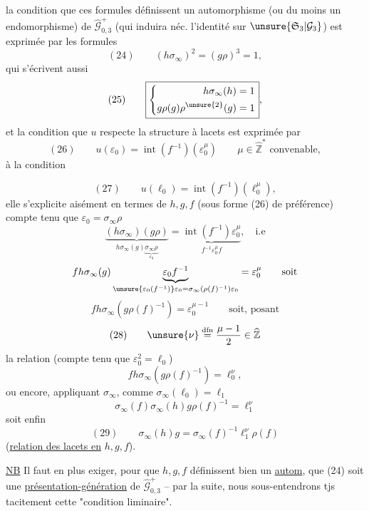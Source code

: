 la condition que ces formules définissent un automorphisme (ou du moins un endomorphisme) de $\widehat{\mathcal G}_{0,3}^{+}$ (qui induira néc. l'identité sur $\unsure{\mathfrak S_3|\mathcal G_3}$) est exprimée par les formules
\[
(24)\qquad (h\sigma_\infty)^{2}=(g\rho)^{3}=1,
\]
qui s'écrivent aussi
\[
(25)\qquad
\boxed{\left\{\begin{aligned}
h\sigma_\infty(h)&=1\\
g\rho(g)\rho^{\unsure{2}}(g)&=1
\end{aligned}\right.},
\]
et la condition que $u$ respecte la structure à lacets est exprimée par
\[
(26)\qquad u(\varepsilon_0)=\operatorname{int}(f^{-1})(\varepsilon_0^{\mu})
\qquad \mu\in\widehat{\mathbb Z}^{*}\text{ convenable},
\]
 à la condition


\[
(27)\qquad
u(\ell_0)=\operatorname{int}(f^{-1})(\ell_0^{\mu}),
\]
elle s'explicite aisément en termes de $h,g,f$ (sous forme (26) de préférence) compte tenu que $\varepsilon_0=\sigma_\infty\rho$
\[
\underbrace{(h\sigma_\infty)(g\rho)}_{h\sigma_\infty(g)\underbrace{\sigma_\infty\rho}_{\varepsilon_0}}
=\underbrace{\operatorname{int}(f^{-1})\varepsilon_0^{\mu}}_{f^{-1}\varepsilon_0^{\mu}f},\quad\text{i.e}
\]
\[
f h\sigma_\infty(g)\underbrace{\varepsilon_0 f^{-1}}_{\unsure{\varepsilon_0(f^{-1})}\varepsilon_0=\sigma_\infty(\rho(f)^{-1})\varepsilon_0}
=\varepsilon_0^{\mu}\qquad\text{soit}
\]
\[
f h\sigma_\infty(g\rho(f)^{-1})=\varepsilon_0^{\mu-1}
\qquad\text{soit, posant}
\]
\[
(28)\qquad \unsure{\nu}\overset{\mathrm{dfn}}{=}\frac{\mu-1}{2}\in\widehat{\mathbb Z}
\]
la relation (compte tenu que $\varepsilon_0^{2}=\ell_0$)
\[
f h\sigma_\infty(g\rho(f)^{-1})=\ell_0^{\nu},
\]
ou encore, appliquant $\sigma_\infty$, comme $\sigma_\infty(\ell_0)=\ell_1$
\[
\sigma_\infty(f)\sigma_\infty(h)g\rho(f)^{-1}=\ell_1^{\nu}
\]
soit enfin
\[
(29)\qquad
\boxed{\sigma_\infty(h)g=\sigma_\infty(f)^{-1}\ell_1^{\nu}\rho(f)}
\]
(\uline{relation des lacets en} $h,g,f$).


\uline{NB} Il faut en plus exiger, pour que $h,g,f$ définissent bien un \uline{autom}, que (24) soit une \uline{présentation-génération} de $\widehat{\mathcal G}_{0,3}^{+}$ -- par la suite, nous sous-entendrons tjs tacitement cette "condition liminaire".
